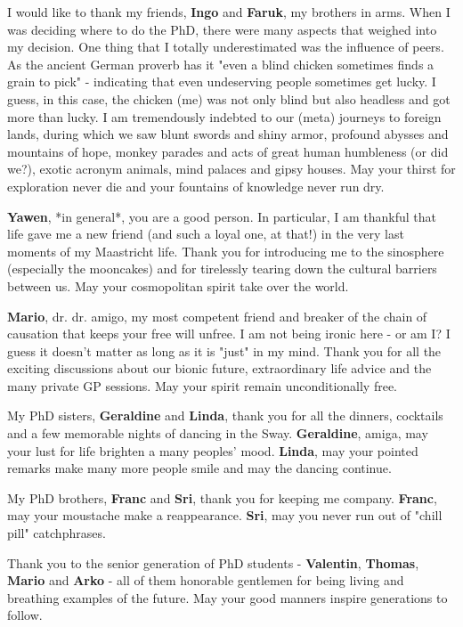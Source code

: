 I would like to thank my friends, \textbf{Ingo} and \textbf{Faruk}, my brothers in arms. When I was deciding where to do the PhD, there were many aspects that weighed into my decision. One thing that I totally underestimated was the influence of peers. As the ancient German proverb has it "even a blind chicken sometimes finds a grain to pick" - indicating that even undeserving people sometimes get lucky. I guess, in this case, the chicken (me) was not only blind but also headless and got more than lucky. I am tremendously indebted to our (meta) journeys to foreign lands, during which we saw blunt swords and shiny armor, profound abysses and mountains of hope, monkey parades and acts of great human humbleness (or did we?), exotic acronym animals, mind palaces and gipsy houses. May your thirst for exploration never die and your fountains of knowledge never run dry.

\textbf{Yawen}, *in general*, you are a good person. In particular, I am thankful that life gave me a new friend (and such a loyal one, at that!) in the very last moments of my Maastricht life. Thank you for introducing me to the sinosphere (especially the mooncakes) and for tirelessly tearing down the cultural barriers between us. May your cosmopolitan spirit take over the world.

\textbf{Mario}, dr. dr. amigo, my most competent friend and breaker of the chain of causation that keeps your free will unfree. I am not being ironic here - or am I? I guess it doesn't matter as long as it is "just" in my mind. Thank you for all the exciting discussions about our bionic future, extraordinary life advice and the many private GP sessions. May your spirit remain unconditionally free.

My PhD sisters, \textbf{Geraldine} and \textbf{Linda}, thank you for all the dinners, cocktails and a few memorable nights of dancing in the Sway. \textbf{Geraldine}, amiga, may your lust for life brighten a many peoples' mood. \textbf{Linda}, may your pointed remarks make many more people smile and may the dancing continue.

My PhD brothers, \textbf{Franc} and \textbf{Sri}, thank you for keeping me company. \textbf{Franc}, may your moustache make a reappearance. \textbf{Sri}, may you never run out of "chill pill" catchphrases.

Thank you to the senior generation of PhD students - \textbf{Valentin}, \textbf{Thomas}, \textbf{Mario} and \textbf{Arko} - all of them honorable gentlemen for being living and breathing examples of the future. May your good manners inspire generations to follow.

